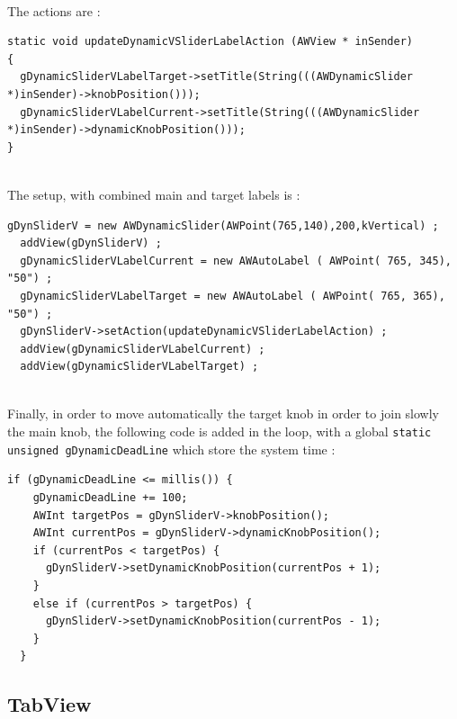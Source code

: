 \documentclass[a4paper,11pt]{extarticle}
\begin{document}
~\\ The actions are :

\begin{lstlisting}[language=Arduinonl]
static void updateDynamicVSliderLabelAction (AWView * inSender)
{
  gDynamicSliderVLabelTarget->setTitle(String(((AWDynamicSlider *)inSender)->knobPosition()));
  gDynamicSliderVLabelCurrent->setTitle(String(((AWDynamicSlider *)inSender)->dynamicKnobPosition()));
}
\end{lstlisting}

~\\ The setup, with combined main and target labels is :

\begin{lstlisting}[language=Arduinonl]
  gDynSliderV = new AWDynamicSlider(AWPoint(765,140),200,kVertical) ;
  addView(gDynSliderV) ;
  gDynamicSliderVLabelCurrent = new AWAutoLabel ( AWPoint( 765, 345), "50") ;
  gDynamicSliderVLabelTarget = new AWAutoLabel ( AWPoint( 765, 365), "50") ;
  gDynSliderV->setAction(updateDynamicVSliderLabelAction) ;
  addView(gDynamicSliderVLabelCurrent) ;
  addView(gDynamicSliderVLabelTarget) ;
\end{lstlisting}

~\\ Finally, in order to move automatically the target knob  in order to join slowly the main knob, the following code is added in the loop, with a global \texttt{static unsigned gDynamicDeadLine} which store the system time :

\begin{lstlisting}[language=Arduinonl]
  if (gDynamicDeadLine <= millis()) {
    gDynamicDeadLine += 100;
    AWInt targetPos = gDynSliderV->knobPosition();
    AWInt currentPos = gDynSliderV->dynamicKnobPosition();
    if (currentPos < targetPos) {
      gDynSliderV->setDynamicKnobPosition(currentPos + 1);
    }
    else if (currentPos > targetPos) {
      gDynSliderV->setDynamicKnobPosition(currentPos - 1);
    }
  }
\end{lstlisting}


\newpage
\subsection{TabView}
\end{document}
